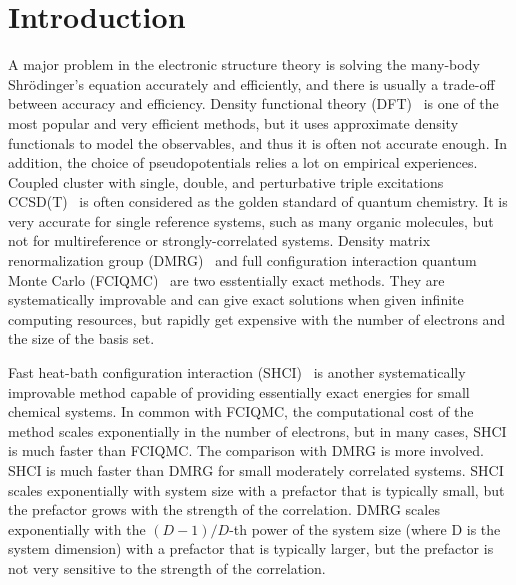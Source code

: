 \documentclass[phd,tocprelim]{cornell}
\begin{document}
\normalspacing \setcounter{page}{1} 
\pagestyle{cornell} \addtolength{\parskip}{0.5\baselineskip}

\chapter{Introduction}
\label{ch:intro}
A major problem in the electronic structure theory is solving the many-body Shr\"{o}dinger's equation accurately and efficiently, and there is usually a trade-off between accuracy and efficiency.
Density functional theory (DFT)~\cite{ParYan-BOOK-89,DreGro-BOOK-90,kohn1999nobel} is one of the most popular and very efficient methods, but it uses approximate density functionals to model the observables, and thus it is often not accurate enough.
In addition, the choice of pseudopotentials relies a lot on empirical experiences.
Coupled cluster with single, double, and perturbative triple excitations CCSD(T)~\cite{raghavachari1989fifth} is often considered as the golden standard of quantum chemistry.
It is very accurate for single reference systems, such as many organic molecules, but not for multireference or strongly-correlated systems.
Density matrix renormalization group (DMRG)~\cite{white1993density,white1999ab,chan2002highly,chan2011density,ShaCha-JCP-12,olivares2015ab,schollwock2005density,GuoLiCha-JCTC-18}
and full configuration interaction quantum Monte Carlo (FCIQMC)~\cite{BooThoAla-JCP-09,CleBooAla-JCP-10,PetHolChaNigUmr-PRL-12,BooGruKreAla-Nat-13,HolChaUmr-JCTC-16}
are two esstentially exact methods.
They are systematically improvable and can give exact solutions when given infinite computing resources, but rapidly get expensive with the number of electrons and the size of the basis set.

Fast heat-bath configuration interaction (SHCI)~\cite{HolTubUmr-JCTC-16,ShaHolJeaAlaUmr-JCTC-17,HolUmrSha-JCP-17,SmiMusHolSha-JCTC-17,MusSha-JCTC-17,ChiHolOttUmrShaZim-JPCA-18} is another systematically improvable method capable of providing essentially exact energies for small chemical systems.
In common with FCIQMC, the computational cost of the method scales exponentially in the number of electrons, but in many cases, SHCI is much faster than FCIQMC.
The comparison with DMRG is more involved.
SHCI is much faster than DMRG for small moderately correlated systems.
SHCI scales exponentially with system size with a prefactor that is typically small, but the prefactor grows with
the strength of the correlation.
DMRG scales exponentially with the $(D-1)/D$-th power of the system size (where D is the system dimension) with a prefactor that is typically larger,
but the prefactor is not very sensitive to the strength of the correlation.
\end{document}
